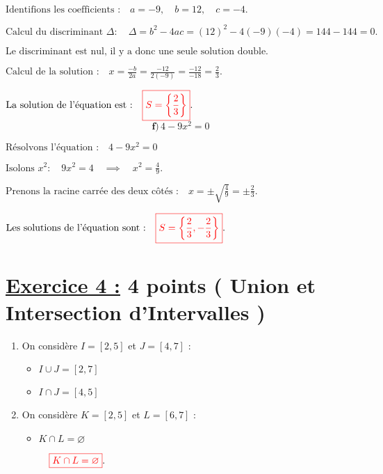 \documentclass[12pt,a4paper]{article}
\begin{document}
\(
\text{Identifions les coefficients :} \quad a = -9, \quad b = 12, \quad c = -4.
\)

\(
\text{Calcul du discriminant } \Delta : \quad
\Delta = b^2 - 4ac = (12)^2 - 4(-9)(-4) = 144 - 144 = 0.
\)

\(
\text{Le discriminant est nul, il y a donc une seule solution double.}
\)

\(
\text{Calcul de la solution :} \quad
x = \frac{-b}{2a} = \frac{-12}{2(-9)} = \frac{-12}{-18} = \frac{2}{3}.
\)

\(
\text{La solution de l'équation est :} \quad
\textcolor{red}{\boxed{S=\left\lbrace  \frac{2}{3} \right\rbrace }}.
\)\\

\[ \textbf{f)} \, 4 - 9x^2 = 0 \]

\( \text{Résolvons l'équation :} \quad 4 - 9x^2 = 0 \)

\(
\text{Isolons } x^2 : \quad 9x^2 = 4 \quad \implies \quad x^2 = \frac{4}{9}.
\)

\(
\text{Prenons la racine carrée des deux côtés :} \quad x = \pm \sqrt{\frac{4}{9}} = \pm \frac{2}{3}.
\)

\(
\text{Les solutions de l'équation sont :} \quad
\textcolor{red}{\boxed{S=\left\lbrace  \frac{2}{3},-\frac{2}{3} \right\rbrace }}.
\)


\section*{\underline{Exercice 4 :} 4 points ( Union et Intersection d'Intervalles )}  

\begin{enumerate}
    \item On considère $I = [2, 5]$ et $J = [4, 7]$ :
    \begin{itemize}
        \item $I \cup J = [2, 7]$
        \item $I \cap J = [4, 5]$
    \end{itemize}

    \item On considère $K = [2, 5]$ et $L = [6, 7]$ :
    \begin{itemize}
        \item $K \cap L = \varnothing$
        
 \(
 \quad
\textcolor{red}{\boxed{K \cap L = \varnothing  }}.
\)
    \end{itemize}
\end{enumerate}
\end{document}
